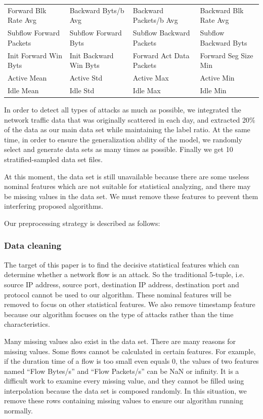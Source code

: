 \documentclass{ieeeaccess}
\theoremstyle{definition}
\begin{document}
\begin{table}[!htpb]
\begin{tabular}{llll}
    Forward Blk Rate Avg & Backward Byts/b Avg & Backward Packets/b Avg & Backward Blk Rate Avg \\
    Subflow Forward Packets & Subflow Forward Byts & Subflow Backward Packets & Subflow Backward Byts \\
    Init Forward Win Byts &  Init Backward Win Byts &   Forward Act Data Packets & Forward Seg Size Min \\
    Active Mean & Active Std & Active Max & Active Min \\
    Idle Mean & Idle Std & Idle Max & Idle Min \\
    \bottomrule
    \end{tabular}
\end{table}

In order to detect all types of attacks as much as possible, we integrated the network traffic data that was originally scattered in each day, and extracted 20\% of the data as our main data set while maintaining the label ratio. At the same time, in order to ensure the generalization ability of the model, we randomly select and generate data sets as many times as possible. Finally we get 10 stratified-sampled data set files. 

At this moment, the data set is still unavailable because there are some useless nominal features which are not suitable for statistical analyzing, and there may be missing values in the data set. We must remove these features to prevent them interfering proposed algorithms.

Our preprocessing strategy is described as follows:

\subsubsection{Data cleaning}
The target of this paper is to find the decisive statistical features which can determine whether a network flow is an attack. 
So the traditional 5-tuple, i.e. source IP address, source port, destination IP address, destination port and protocol cannot be used to our algorithm. 
These nominal features will be removed to focus on other statistical features. 
We also remove timestamp feature because our algorithm focuses on the type of attacks rather than the time characteristics.

Many missing values also exist in the data set. There are many reasons for missing values. Some flows cannot be calculated in certain features. For example, if the duration time of a flow is too small even equals 0, the values of two features named ``Flow Bytes/s'' and ``Flow Packets/s'' can be NaN or infinity. It is a difficult work to examine every missing value, and they cannot be filled using interpolation because the data set is composed randomly. In this situation, we remove these rows containing missing values to ensure our algorithm running normally.
\end{document}
